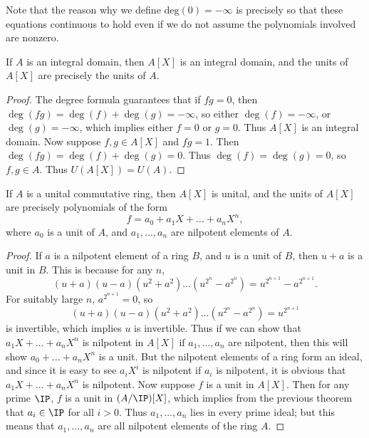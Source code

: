 \begin{remark}
    Note that the reason why we define $\text{deg}(0) = -\infty$ is precisely so that these equations continuous to hold even if we do not assume the polynomials involved are nonzero.
\end{remark}

\begin{lemma}
    If $A$ is an integral domain, then $A[X]$ is an integral domain, and the units of $A[X]$ are precisely the units of $A$.
\end{lemma}
\begin{proof}
    The degree formula guarantees that if $fg = 0$, then $\deg(fg) = \deg(f) + \deg(g) = -\infty$, so either $\deg(f) = -\infty$, or $\deg(g) = -\infty$, which implies either $f = 0$ or $g = 0$. Thus $A[X]$ is an integral domain. Now suppose $f,g \in A[X]$ and $fg = 1$. Then $\deg(fg) = \deg(f) + \deg(g) = 0$. Thus $\deg(f) = \deg(g) = 0$, so $f,g \in A$. Thus $U(A[X]) = U(A)$.
\end{proof}

\begin{corollary}
    If $A$ is a unital commutative ring, then $A[X]$ is unital, and the units of $A[X]$ are precisely polynomials of the form
    \[ f = a_0 + a_1 X + \dots + a_n X^n, \]
    where $a_0$ is a unit of $A$, and $a_1, \dots, a_n$ are nilpotent elements of $A$.
\end{corollary}
\begin{proof}
    If $a$ is a nilpotent element of a ring $B$, and $u$ is a unit of $B$, then $u + a$ is a unit in $B$. This is because for any $n$,
    \[ (u + a)(u - a)(u^2 + a^2)\dots (u^{2^n} - a^{2^n}) = u^{2^{n+1}} - a^{2^{n + 1}}. \]
    For suitably large $n$, $a^{2^{n+1}} = 0$, so
    \[ (u + a)(u - a)(u^2 + a^2)\dots (u^{2^n} - a^{2^n}) = u^{2^{n+1}} \]
    is invertible, which implies $u$ is invertible. Thus if we can show that $a_1 X + \dots + a_n X^n$ is nilpotent in $A[X]$ if $a_1, \dots, a_n$ are nilpotent, then this will show $a_0 + \dots + a_n X^n$ is a unit. But the nilpotent elements of a ring form an ideal, and since it is easy to see $a_i X^i$ is nilpotent if $a_i$ is nilpotent, it is obvious that $a_1 X + \dots + a_n X^n$ is nilpotent. Now suppose $f$ is a unit in $A[X]$. Then for any prime $\IP$, $f$ is a unit in $(A/\IP)[X]$, which implies from the previous theorem that $a_i \in \IP$ for all $i > 0$. Thus $a_1, \dots, a_n$ lies in every prime ideal; but this means that $a_1, \dots, a_n$ are all nilpotent elements of the ring $A$.
\end{proof}

